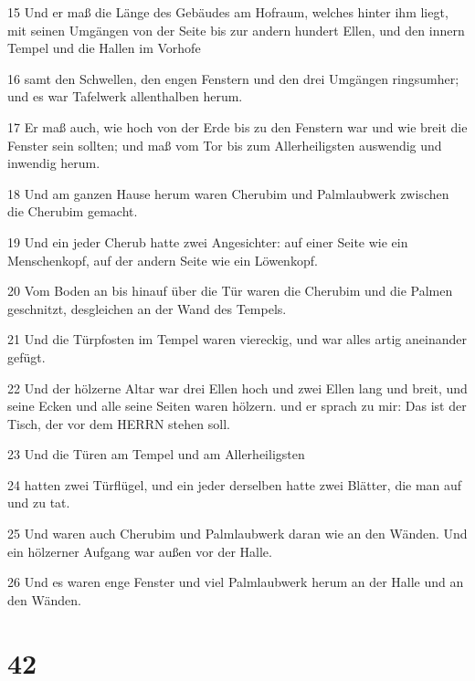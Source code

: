 \par 15 Und er maß die Länge des Gebäudes am Hofraum, welches hinter ihm liegt, mit seinen Umgängen von der Seite bis zur andern hundert Ellen, und den innern Tempel und die Hallen im Vorhofe
\par 16 samt den Schwellen, den engen Fenstern und den drei Umgängen ringsumher; und es war Tafelwerk allenthalben herum.
\par 17 Er maß auch, wie hoch von der Erde bis zu den Fenstern war und wie breit die Fenster sein sollten; und maß vom Tor bis zum Allerheiligsten auswendig und inwendig herum.
\par 18 Und am ganzen Hause herum waren Cherubim und Palmlaubwerk zwischen die Cherubim gemacht.
\par 19 Und ein jeder Cherub hatte zwei Angesichter: auf einer Seite wie ein Menschenkopf, auf der andern Seite wie ein Löwenkopf.
\par 20 Vom Boden an bis hinauf über die Tür waren die Cherubim und die Palmen geschnitzt, desgleichen an der Wand des Tempels.
\par 21 Und die Türpfosten im Tempel waren viereckig, und war alles artig aneinander gefügt.
\par 22 Und der hölzerne Altar war drei Ellen hoch und zwei Ellen lang und breit, und seine Ecken und alle seine Seiten waren hölzern. und er sprach zu mir: Das ist der Tisch, der vor dem HERRN stehen soll.
\par 23 Und die Türen am Tempel und am Allerheiligsten
\par 24 hatten zwei Türflügel, und ein jeder derselben hatte zwei Blätter, die man auf und zu tat.
\par 25 Und waren auch Cherubim und Palmlaubwerk daran wie an den Wänden. Und ein hölzerner Aufgang war außen vor der Halle.
\par 26 Und es waren enge Fenster und viel Palmlaubwerk herum an der Halle und an den Wänden.

\chapter{42}

